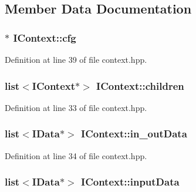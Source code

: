 \subsection{Member Data Documentation}
\hypertarget{class_i_context_a8dcedbb370532b4cfd613fd1dae366c1}{
\subsubsection[{cfg}]{$\ast$ {\bf IContext::cfg}}}
\label{class_i_context_a8dcedbb370532b4cfd613fd1dae366c1}


Definition at line 39 of file context.hpp.\hypertarget{class_i_context_a4b81890185d165540acdeb1e012264be}{
\subsubsection[{children}]{\setlength{\rightskip}{0pt plus 5cm}list$<${\bf IContext}$\ast$$>$ {\bf IContext::children}}}
\label{class_i_context_a4b81890185d165540acdeb1e012264be}


Definition at line 33 of file context.hpp.\hypertarget{class_i_context_a398973dc27b31e89a4b4ab0f701dfee5}{
\subsubsection[{in\_\-outData}]{\setlength{\rightskip}{0pt plus 5cm}list$<${\bf IData}$\ast$$>$ {\bf IContext::in\_\-outData}}}
\label{class_i_context_a398973dc27b31e89a4b4ab0f701dfee5}


Definition at line 34 of file context.hpp.\hypertarget{class_i_context_a7284704610c7ea7cca699c8116feee0c}{
\subsubsection[{inputData}]{\setlength{\rightskip}{0pt plus 5cm}list$<${\bf IData}$\ast$$>$ {\bf IContext::inputData}}}
\label{class_i_context_a7284704610c7ea7cca699c8116feee0c}


